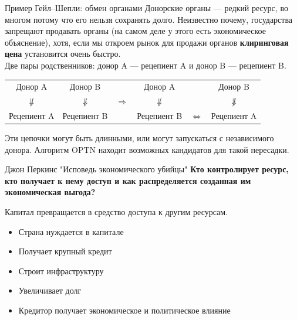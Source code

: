 \documentclass[10pt]{beamer}
\begin{document}
\begin{frame}{Пример Гейл--Шепли: обмен органами}
Донорские органы --- редкий ресурс, во многом потому что его нельзя сохранять долго. Неизвестно почему, государства запрещают продавать органы (на самом деле у этого есть экономическое объяснение), хотя, если мы откроем рынок для продажи органов \textbf{клиринговая цена} установится очень быстро.\\

Две пары родственников: донор A --- рецепиент A и донор B --- рецепиент B.

\begin{tabular}{cccccc}
Донор A & Донор B &  & Донор A & & Донор B\\
$\not\Downarrow$ & $\not\Downarrow$ & $ \Longrightarrow $ & $\not\Downarrow$ & & $\not\Downarrow$ \\
Рецепиент A & Рецепиент B &  & Рецепиент B & $ \Leftrightarrow $ & Рецепиент A
\end{tabular}

Эти цепочки могут быть длинными, или могут запускаться с независимого донора. Алгоритм OPTN находит возможных кандидатов для такой пересадки.  
\end{frame}




\begin{frame}{Джон Перкинс "Исповедь экономического убийцы"}
 \textbf{Кто контролирует ресурс, кто получает к нему доступ и как распределяется созданная им экономическая выгода?}
 \vspace{0.5cm}

Капитал превращается в средство доступа к другим ресурсам.

\begin{itemize}
    \item Страна нуждается в капитале
    \item Получает крупный кредит
    \item Строит инфраструктуру
    \item Увеличивает долг
    \item Кредитор получает экономическое и политическое влияние
\end{itemize}
 
\end{frame}
\end{document}
